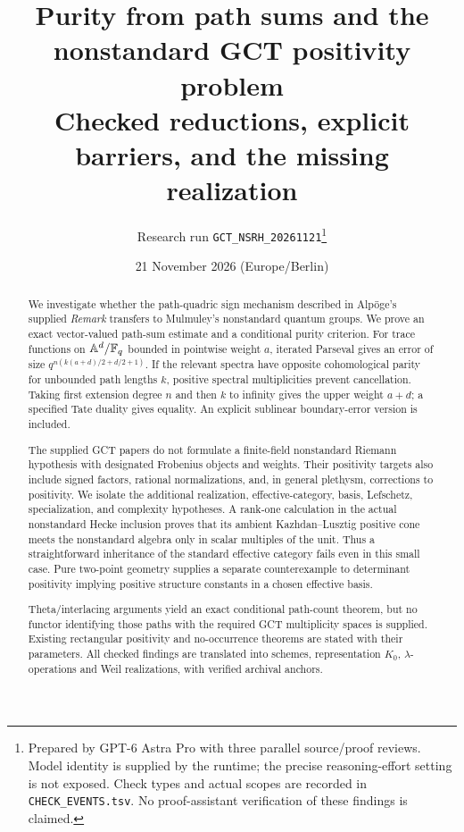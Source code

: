 \documentclass[11pt,a4paper]{article}
\title{Purity from path sums and the nonstandard GCT positivity problem\\[4pt]\large Checked reductions, explicit barriers, and the missing realization}
\author{Research run \texttt{GCT\_NSRH\_20261121}\thanks{Prepared by GPT-6 Astra Pro with three parallel source/proof reviews. Model identity is supplied by the runtime; the precise reasoning-effort setting is not exposed. Check types and actual scopes are recorded in \texttt{CHECK\_EVENTS.tsv}. No proof-assistant verification of these findings is claimed.}}
\date{21 November 2026 (Europe/Berlin)}
\newcommand{\A}{\mathbb A}\newcommand{\PP}{\mathbb P}\newcommand{\GL}{\mathrm{GL}}
\theoremstyle{named}\newtheorem{finding}{Finding}[section]
\theoremstyle{definition}\newtheorem{definition}[finding]{Definition}
\theoremstyle{remark}\newtheorem{remark}[finding]{Remark}
\begin{document}
\maketitle
\begin{abstract}
We investigate whether the path-quadric sign mechanism described in Alp\"oge's supplied \emph{Remark} transfers to Mulmuley's nonstandard quantum groups. We prove an exact vector-valued path-sum estimate and a conditional purity criterion. For trace functions on $\A^d/\F_q$ bounded in pointwise weight $a$, iterated Parseval gives an error of size $q^{n(k(a+d)/2+d/2+1)}$. If the relevant spectra have opposite cohomological parity for unbounded path lengths $k$, positive spectral multiplicities prevent cancellation. Taking first extension degree $n$ and then $k$ to infinity gives the upper weight $a+d$; a specified Tate duality gives equality. An explicit sublinear boundary-error version is included.

The supplied GCT papers do not formulate a finite-field nonstandard Riemann hypothesis with designated Frobenius objects and weights. Their positivity targets also include signed factors, rational normalizations, and, in general plethysm, corrections to positivity. We isolate the additional realization, effective-category, basis, Lefschetz, specialization, and complexity hypotheses. A rank-one calculation in the actual nonstandard Hecke inclusion proves that its ambient Kazhdan--Lusztig positive cone meets the nonstandard algebra only in scalar multiples of the unit. Thus a straightforward inheritance of the standard effective category fails even in this small case. Pure two-point geometry supplies a separate counterexample to determinant positivity implying positive structure constants in a chosen effective basis.

Theta/interlacing arguments yield an exact conditional path-count theorem, but no functor identifying those paths with the required GCT multiplicity spaces is supplied. Existing rectangular positivity and no-occurrence theorems are stated with their parameters. All checked findings are translated into schemes, representation $K_0$, $\lambda$-operations and Weil realizations, with verified archival anchors.
\end{abstract}
\begin{center}
\end{center}
\tableofcontents\newpage
\end{document}
